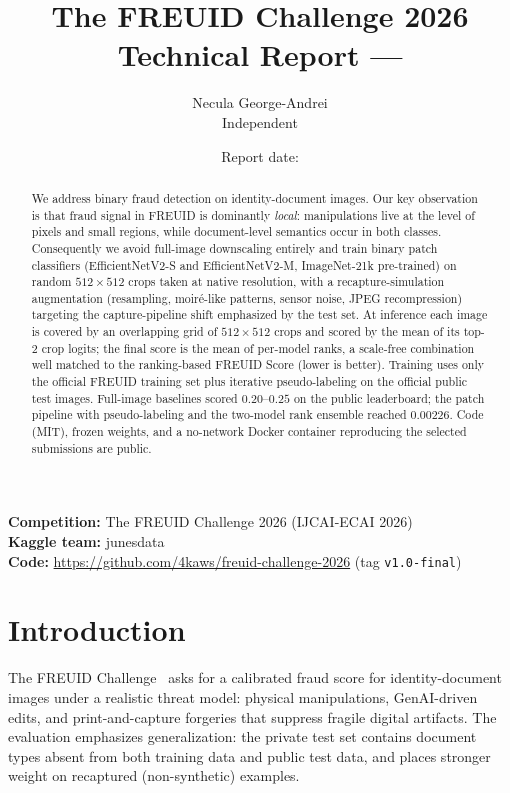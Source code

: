 \documentclass[11pt,a4paper]{article}
\title{%
  \textbf{The FREUID Challenge 2026}\\[0.4em]
  \large Technical Report --- \teamname
}
\author{%
  Necula George-Andrei\\
  \small Independent\\
  \texttt{\contactemail}
}
\date{Report date: \reportdate}
\newcommand{\kaggleteam}{junesdata}
\begin{document}
\maketitle

\begin{abstract}
We address binary fraud detection on identity-document images. Our key observation is
that fraud signal in FREUID is dominantly \emph{local}: manipulations live at the level
of pixels and small regions, while document-level semantics occur in both classes.
Consequently we avoid full-image downscaling entirely and train binary patch
classifiers (EfficientNetV2-S and EfficientNetV2-M, ImageNet-21k pre-trained) on random
$512\times512$ crops taken at native resolution, with a recapture-simulation
augmentation (resampling, moir\'e-like patterns, sensor noise, JPEG recompression)
targeting the capture-pipeline shift emphasized by the test set. At inference each
image is covered by an overlapping grid of $512\times512$ crops and scored by the mean
of its top-2 crop logits; the final score is the mean of per-model ranks, a scale-free
combination well matched to the ranking-based FREUID Score (lower is better). Training
uses only the official FREUID training set plus iterative pseudo-labeling on the
official public test images. Full-image baselines scored $0.20$--$0.25$ on the public
leaderboard; the patch pipeline with pseudo-labeling and the two-model rank ensemble
reached $\mathbf{0.00226}$. Code (MIT), frozen weights, and a no-network Docker
container reproducing the selected submissions are public.
\end{abstract}

\noindent\textbf{Competition:} The FREUID Challenge 2026 (IJCAI-ECAI 2026)\\
\textbf{Kaggle team:} \kaggleteam\\
\textbf{Code:} \url{https://github.com/4kaws/freuid-challenge-2026} (tag \texttt{v1.0-final})\\

\section{Introduction}
\label{sec:intro}
The FREUID Challenge~\cite{freuid2026} asks for a calibrated fraud score for
identity-document images under a realistic threat model: physical manipulations,
GenAI-driven edits, and print-and-capture forgeries that suppress fragile digital
artifacts. The evaluation emphasizes generalization: the private test set contains
document types absent from both training data and public test data, and places
stronger weight on recaptured (non-synthetic) examples.
\end{document}
